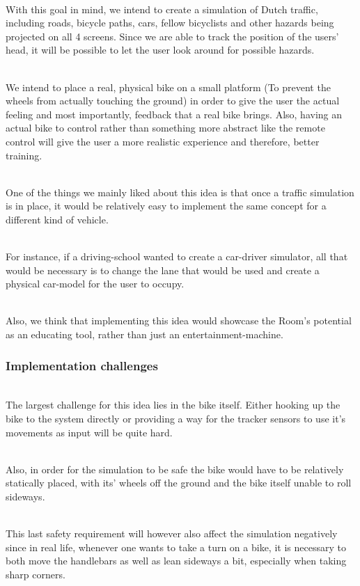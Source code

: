 \documentclass[11pt]{article}
\begin{document}
~\\
With this goal in mind, we intend to create a simulation of Dutch traffic, including roads, bicycle paths, cars, fellow bicyclists and other hazards being projected on all 4 screens. Since we are able to track the position of the users' head, it will be possible to let the user look around for possible hazards. 

~\\
We intend to place a real, physical bike on a small platform (To prevent the wheels from actually touching the ground) in order to give the user the actual feeling and most importantly, feedback that a real bike brings. Also, having an actual bike to control rather than something more abstract like the remote control will give the user a more realistic experience and therefore, better training.

~\\
One of the things we mainly liked about this idea is that once a traffic simulation is in place, it would be relatively easy to implement the same concept for a different kind of vehicle.

~\\
For instance, if a driving-school wanted to create a car-driver simulator, all that would be necessary is to change the lane that would be used and create a physical car-model for the user to occupy.

~\\
Also, we think that implementing this idea would showcase the Room's potential as an educating tool, rather than just an entertainment-machine.

\newpage
{}
\subsubsection*{Implementation challenges}
~\\
The largest challenge for this idea lies in the bike itself. Either hooking up the bike to the system directly or providing a way for the tracker sensors to use it's movements as input will be quite hard. 

~\\
Also, in order for the simulation to be safe the bike would have to be relatively statically placed, with its' wheels off the ground and the bike itself unable to roll sideways. 

~\\
This last safety requirement will however also affect the simulation negatively since in real life, whenever one wants to take a turn on a bike, it is necessary to both move the handlebars as well as lean sideways a bit, especially when taking sharp corners.
\end{document}
